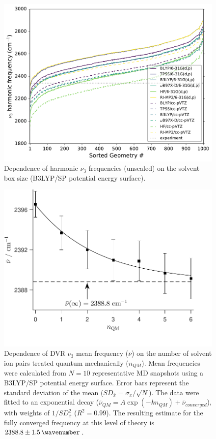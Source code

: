 \begin{figure}
  \centering
  \includegraphics[width=\textwidth]{paper_02/Fig4.pdf}
  \caption{Dependence of harmonic \(\nu_3\) frequencies (unscaled) on the solvent box size (B3LYP/SP potential energy surface).}
  \label{paper_02:fig:4}
\end{figure}

\begin{figure}
  \centering
  \includegraphics{paper_02/Fig5.pdf}
  \caption[DVR convergence with respect to number of QM ion pairs]{Dependence of DVR \(\nu_{3}\) mean frequency (\(\overline{\nu}\)) on the number of solvent ion pairs treated quantum mechanically (\(n_{QM}\)). Mean frequencies were calculated from \(N = 10\) representative MD snapshots using a B3LYP/SP potential energy surface. Error bars represent the standard deviation of the mean (\(SD_{\overline{x}} = \sigma_{x}/\sqrt{N}\)). The data were fitted to an exponential decay (\({\overline{\nu}}_{QM} = A\exp\left( - kn_{QM} \right) + {\overline{\nu}}_{converged}\)), with weights of \(1/SD_{\overline{x}}^{2}\) (\(R^2 = 0.99\)). The resulting estimate for the fully converged frequency at this level of theory is \(2388.8 \pm \SI{1.5}{\wavenumber}\).}
  \label{paper_02:fig:5}
\end{figure}

